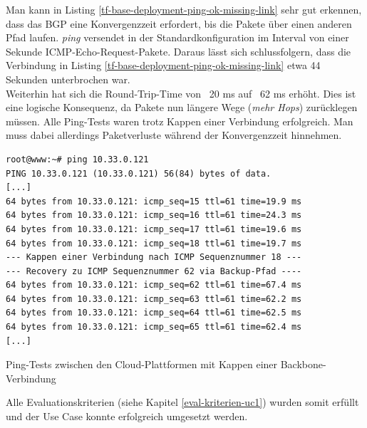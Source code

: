 Man kann in Listing \ref{tf-base-deployment-ping-ok-missing-link} sehr gut erkennen, dass das \gls{BGP} eine Konvergenzzeit erfordert, bis die Pakete über einen anderen Pfad laufen. \textit{ping} versendet in der Standardkonfiguration im Interval von einer Sekunde \gls{ICMP}-Echo-Request-Pakete. Daraus lässt sich schlussfolgern, dass die Verbindung in Listing \ref{tf-base-deployment-ping-ok-missing-link} etwa 44 Sekunden unterbrochen war.\\
Weiterhin hat sich die Round-Trip-Time von ~20 ms auf ~62 ms erhöht. Dies ist eine logische Konsequenz, da Pakete nun längere Wege (\textit{mehr Hops}) zurücklegen müssen. Alle Ping-Tests waren trotz Kappen einer Verbindung erfolgreich. Man muss dabei allerdings Paketverluste während der Konvergenzzeit hinnehmen.
\begin{listing}[h]
\begin{verbatim}
root@www:~# ping 10.33.0.121
PING 10.33.0.121 (10.33.0.121) 56(84) bytes of data.
[...]
64 bytes from 10.33.0.121: icmp_seq=15 ttl=61 time=19.9 ms
64 bytes from 10.33.0.121: icmp_seq=16 ttl=61 time=24.3 ms
64 bytes from 10.33.0.121: icmp_seq=17 ttl=61 time=19.6 ms
64 bytes from 10.33.0.121: icmp_seq=18 ttl=61 time=19.7 ms 
--- Kappen einer Verbindung nach ICMP Sequenznummer 18 ---
--- Recovery zu ICMP Sequenznummer 62 via Backup-Pfad ----
64 bytes from 10.33.0.121: icmp_seq=62 ttl=61 time=67.4 ms
64 bytes from 10.33.0.121: icmp_seq=63 ttl=61 time=62.2 ms
64 bytes from 10.33.0.121: icmp_seq=64 ttl=61 time=62.5 ms
64 bytes from 10.33.0.121: icmp_seq=65 ttl=61 time=62.4 ms
[...]
\end{verbatim}
\caption{Ping-Tests zwischen den Cloud-Plattformen mit Kappen einer Backbone-Verbindung}
\label{tf-base-deployment-ping-ok-missing-link}
\end{listing}\FloatBarrier
Alle Evaluationskriterien (siehe Kapitel \ref{eval-kriterien-uc1}) wurden somit erfüllt und der Use Case konnte erfolgreich umgesetzt werden.
